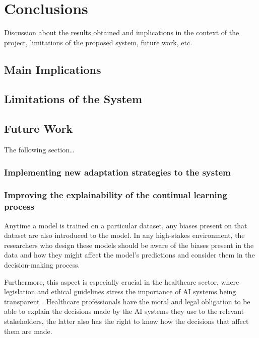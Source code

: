 \documentclass[../main.tex]{subfiles}
\begin{document}
\chapter{Conclusions} \label{chap:conclusions} 
    

    Discussion about the results obtained and implications in the context of the project, limitations of the proposed system, future work, etc.
    

    \section{Main Implications} \label{conclusions:implications} 

    \section{Limitations of the System} \label{conclusions:limitations} 
    
    \section{Future Work} \label{conclusions:future_work} 

    The following section\dots

    \subsection{
        Implementing new adaptation strategies to the system 
    } \label{conclusions:future_work:adaptation_strategies}

    \subsection{
        Improving the explainability of the continual learning process 
    } \label{conclusions:future_work:explainability}

    Anytime a model is trained on a particular dataset, any biases present on that dataset are also introduced to the model. In any high-stakes environment, the researchers who design these models should be aware of the biases present in the data and how they might affect the model's predictions and consider them in the decision-making process.

    Furthermore, this aspect is especially crucial in the healthcare sector, where legislation and ethical guidelines stress the importance of AI systems being transparent \cite{noauthor_ethics_2019,eu_aiact_2023}. Healthcare professionals have the moral and legal obligation to be able to explain the decisions made by the AI systems they use to the relevant stakeholders, the latter also has the right to know how the decisions that affect them are made.
    
\end{document}
